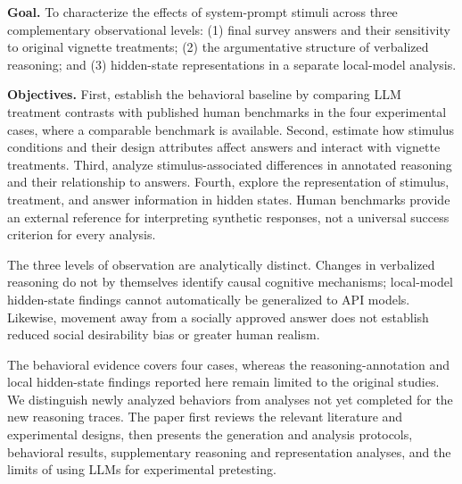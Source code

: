 \textbf{Goal.} To characterize the effects of system-prompt stimuli across three complementary observational levels: (1) final survey answers and their sensitivity to original vignette treatments; (2) the argumentative structure of verbalized reasoning; and (3) hidden-state representations in a separate local-model analysis.

\textbf{Objectives.} First, establish the behavioral baseline by comparing LLM treatment contrasts with published human benchmarks in the four experimental cases, where a comparable benchmark is available. Second, estimate how stimulus conditions and their design attributes affect answers and interact with vignette treatments. Third, analyze stimulus-associated differences in annotated reasoning and their relationship to answers. Fourth, explore the representation of stimulus, treatment, and answer information in hidden states. Human benchmarks provide an external reference for interpreting synthetic responses, not a universal success criterion for every analysis.

The three levels of observation are analytically distinct. Changes in verbalized reasoning do not by themselves identify causal cognitive mechanisms; local-model hidden-state findings cannot automatically be generalized to API models. Likewise, movement away from a socially approved answer does not establish reduced social desirability bias or greater human realism.

The behavioral evidence covers four cases, whereas the reasoning-annotation and local hidden-state findings reported here remain limited to the original studies. We distinguish newly analyzed behaviors from analyses not yet completed for the new reasoning traces. The paper first reviews the relevant literature and experimental designs, then presents the generation and analysis protocols, behavioral results, supplementary reasoning and representation analyses, and the limits of using LLMs for experimental pretesting.
